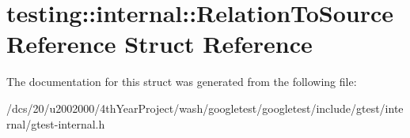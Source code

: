 \hypertarget{structtesting_1_1internal_1_1RelationToSourceReference}{}\section{testing\+:\+:internal\+:\+:Relation\+To\+Source\+Reference Struct Reference}
\label{structtesting_1_1internal_1_1RelationToSourceReference}


The documentation for this struct was generated from the following file\+:\begin{DoxyCompactItemize}
\item 
/dcs/20/u2002000/4th\+Year\+Project/wash/googletest/googletest/include/gtest/internal/gtest-\/internal.\+h\end{DoxyCompactItemize}

